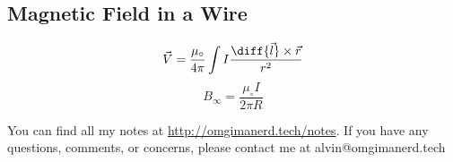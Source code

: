 \documentclass{math}
\begin{document}
\subsection*{Magnetic Field in a Wire}
\begin{center}
\end{center}
\[ \vec{V} = \frac{\mu_{\circ}}{4\pi}
  \int I\frac{\diff{\vec{l}}\times\vec{r}}{r^2} \]
\[ B_{\infty} = \frac{\mu_{\circ}I}{2\pi R} \]

\begin{center}
  You can find all my notes at \url{http://omgimanerd.tech/notes}. If you have
  any questions, comments, or concerns, please contact me at
  alvin@omgimanerd.tech
\end{center}
\end{document}

